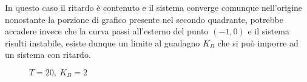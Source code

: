 In questo caso il ritardo è contenuto e il sistema converge comunque
nell'origine nonostante la porzione di grafico presente nel secondo quadrante,
potrebbe accadere invece che la curva passi all'esterno del punto $(-1,0)$ e il
sistema risulti instabile, esiste dunque un limite al guadagno $K_B$ che si può
imporre ad un sistema con ritardo.
\begin{figure}[h]
\centering
\def\T{20}
\caption{$T=\T,\ K_B=2$}
\end{figure}
